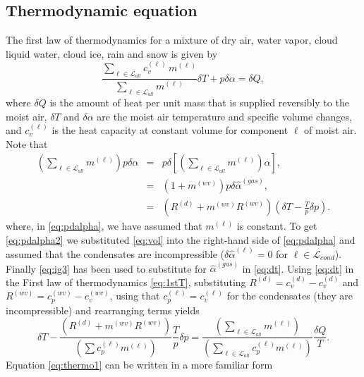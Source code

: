 \documentclass{agujournal}
\begin{document}
{\subsection{Thermodynamic equation}
The first law of thermodynamics for a mixture of dry air, water vapor, cloud liquid water, cloud ice, rain and snow is given by
\begin{equation}
\frac{\sum_{\ell\in \mathcal{L}_{all}} c_{v}^{(\ell)}\, m^{(\ell)}}{\sum_{\ell\in \mathcal{L}_{all}} m^{(\ell)}}\delta T+p\delta \alpha=\delta Q,\label{eq:1stT}
\end{equation}
where $\delta Q$ is the amount of heat per unit mass that is supplied reversibly to the moist air, $\delta T$ and $\delta \alpha$ are the moist air temperature and specific volume changes, and $c_v^{(\ell)}$ is the heat capacity at constant volume for component $\ell$ of moist air. Note that
\begin{eqnarray}
\left( \sum_{\ell \in \mathcal{L}_{all}} m^{(\ell)}\right)p\delta \alpha &=& p \delta \left[ \left( \sum_{\ell \in \mathcal{L}_{all}} m^{(\ell)} \right)\alpha  \right],\label{eq:pdalpha}\\
                                       &=& (1+m^{(wv)})p\delta \hat{\alpha}^{(gas)},\label{eq:pdalpha2}\\
                                       &=& \left(R^{(d)}+m^{(wv)}R^{(wv)}\right)\left(\delta T-\frac{T}{p}\delta p\right)\label{eq:dt}.
\end{eqnarray}
where, in \eqref{eq:pdalpha}, we have assumed that $m^{(\ell)}$ is constant. To get \eqref{eq:pdalpha2} we substituted \eqref{eq:vol} into the right-hand side of \eqref{eq:pdalpha} and assumed that the condensates are incompressible ($\delta \hat{\alpha}^{(\ell)}=0$ for $\ell \in \mathcal{L}_{cond}$). Finally \eqref{eq:ig3} has been used to substitute for $\hat{\alpha}^{(gas)}$ in \eqref{eq:dt}.
Using \eqref{eq:dt} in the First law of thermodynamics \eqref{eq:1stT}, substituting $R^{(d)}=c_v^{(d)}-c_v^{(d)}$ and $R^{(wv)}=c_p^{(wv)}-c_{v}^{(wv)}$, using that $c_p^{(\ell)}=c^{(\ell)}_v$ for the condensates (they are incompressible) and rearranging terms yields
\begin{equation}
\delta T-\frac{\left(R^{(d)}+m^{(wv)}R^{(wv)}\right)}{\left(\sum c_p^{(\ell)}m^{(\ell)}\right)}\frac{T}{p}\delta p=\frac{\left(\sum_{\ell \in \mathcal{L}_{all}} m^{(\ell)}\right)}{\left(\sum_{\ell \in \mathcal{L}_{all}} c_p^{(\ell)}m^{(\ell)}\right)}\frac{\delta Q}{T}.\label{eq:thermo1}
\end{equation}
Equation \eqref{eq:thermo1} can be written in a more familiar form
}
\end{document}
